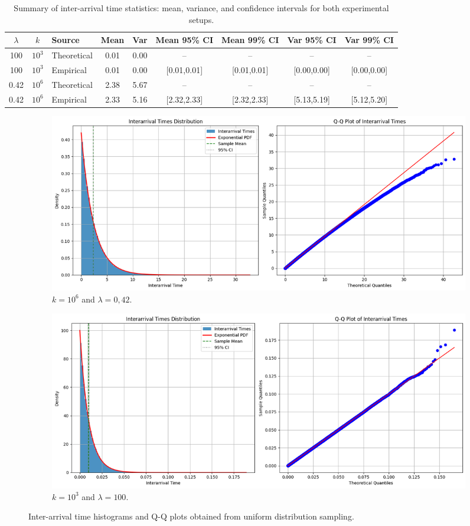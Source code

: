 \documentclass[a4paper]{article}
\begin{document}
\begin{table}[htbp]
  \centering
  \small
  \begin{tabular}{@{}cc|lcccccc@{}}
    \toprule
    $\lambda$ & $k$ & Source & Mean & Var & Mean 95\% CI & Mean 99\% CI & Var 95\% CI & Var 99\% CI \\
    \midrule
    100 & $10^3$ & Theoretical & 0.01 & 0.00 & -- & -- & -- & -- \\
    100 & $10^3$ & Empirical   & 0.01 & 0.00 & [0.01,0.01] & [0.01,0.01] & [0.00,0.00] & [0.00,0.00] \\
    \midrule
    0.42 & $10^6$ & Theoretical & 2.38 & 5.67 & -- & -- & -- & -- \\
    0.42 & $10^6$ & Empirical   & 2.33 & 5.16 & [2.32,2.33] & [2.32,2.33] & [5.13,5.19] & [5.12,5.20] \\
    \bottomrule
  \end{tabular}
  \caption{Summary of inter-arrival time statistics: mean, variance, and confidence intervals for both experimental setups.}\label{tab:ex1-p1-ci-summary}
\end{table}

\begin{figure}[htbp]
  \centering
  \begin{subfigure}[b]{0.48\textwidth}
    \centering
    \includegraphics[width=\textwidth]{images/ex1-p1.png}
    \caption{$k = 10^6$ and $\lambda = 0,42$.}\label{fig:ex1-p1}
  \end{subfigure}
  \hfill
  \begin{subfigure}[b]{0.48\textwidth}
    \centering
    \includegraphics[width=\textwidth]{images/ex1-p1-hl.png}
    \caption{$k = 10^3$ and $\lambda = 100$.}\label{fig:ex1-p1-hl}
  \end{subfigure}
  \caption{Inter-arrival time histograms and Q-Q plots obtained from uniform distribution sampling.}\label{fig:ex1-p1-combined}
\end{figure}
\end{document}
